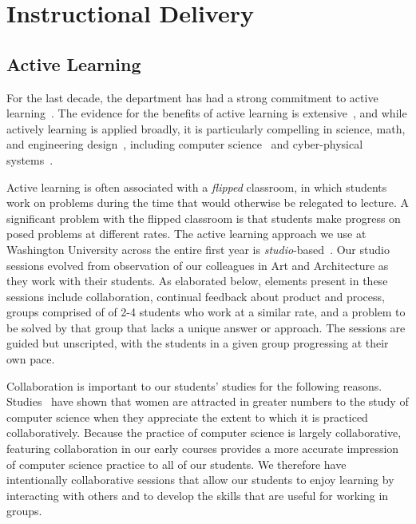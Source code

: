 \section{Instructional Delivery}
\label{sec:delivery}

\subsection{Active Learning}

For the last decade, the department has had a strong commitment to
active learning~\cite{scbggg10,sgcggt10}.
The evidence for the benefits of active learning is
extensive~\cite{jjs98,lst99,Prince04,rss97},
and while actively learning is applied broadly, it is particularly
compelling in science, math, and engineering
design~\cite{Freeman14,lst99,Hake98,Byerley01,kb06}, including computer
science~\cite{McConnell96,tlb01,skltc10,ag13}
and cyber-physical systems~\cite{me14,mmy16}.

Active learning is often associated with a \emph{flipped} classroom, in
which students work on problems during the time that would otherwise be
relegated to lecture.  A significant problem with the flipped classroom is
that students make progress on posed problems at different
rates.
The active learning approach we use at Washington University across the entire
first year is \emph{studio}-based~\cite{hnc08}.
Our studio sessions evolved from observation of our colleagues in
Art and Architecture as they work with their students.  As elaborated below,
elements present in
these sessions include collaboration, continual feedback about product
and process, groups comprised of of 2-4 students who work at a similar rate, 
and a problem to be solved by that group that lacks a unique
answer or approach.  The sessions are guided but unscripted, with the
students in a given group progressing at their own pace.

Collaboration is important to our students' studies for the following reasons.
Studies~\cite{Krause:2012:EFL:2157136.2157192} have shown that women are
attracted in greater numbers to the study of computer science when they
appreciate the extent to which it is practiced collaboratively.  Because
the practice of computer science is largely collaborative, featuring collaboration
in our early courses provides a more accurate impression of computer science
practice to all of our students.  We therefore have intentionally collaborative
sessions that allow our students to enjoy learning by interacting with others
and to develop the skills that are useful for working in groups.

